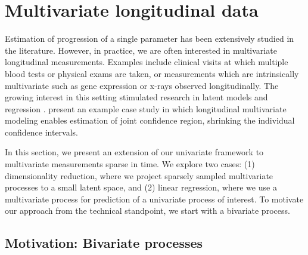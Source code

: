 \documentclass[preprint]{imsart}
\numberwithin{equation}{section}
\theoremstyle{plain}
\begin{document}
\section{Multivariate longitudinal data}\label{s:multivariate}

Estimation of progression of a single parameter has been extensively studied in the literature. However, in practice, we are often interested in multivariate longitudinal measurements. Examples include clinical visits at which multiple blood tests or physical exams are taken, or measurements which are intrinsically multivariate such as gene expression or x-rays observed longitudinally. The growing interest in this setting stimulated research in latent models \citep{sammel1996latent} and regression \citep{gray1998estimating,gray2000multidimensional}. \citet{diggle2002analysis} present an example case study in which longitudinal multivariate modeling enables estimation of joint confidence region, shrinking the individual confidence intervals.

In this section, we present an extension of our univariate framework to multivariate measurements sparse in time. %
We explore two cases: (1) dimensionality reduction, where we project sparsely sampled multivariate processes to a small latent space, and (2) linear regression, where we use a multivariate process for prediction of a univariate process of interest. To motivate our approach from the technical standpoint, we start with a bivariate process.


\subsection{Motivation: Bivariate processes}
\end{document}
